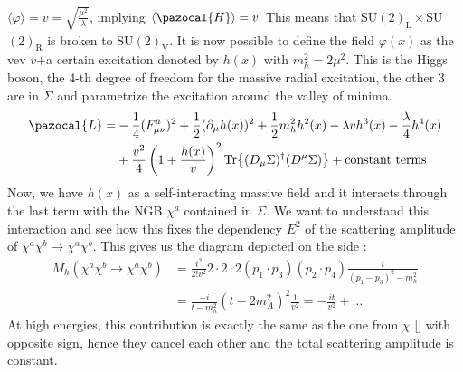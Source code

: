 \documentclass[../main.tex]{subfiles}
\begin{document}
$\langle\varphi\rangle=v=\sqrt{\frac{\mu^2}{\lambda}}$, implying $\langle\pazocal{H}\rangle=v$ This means that SU$(2)_{\text{L}}\times$SU$(2)_{\text{R}}$ is broken to SU$(2)_{\text{V}}$. It is now possible to define the field $\varphi(x)$ as the vev $v$+a certain excitation denoted by $h(x)$ with $m_h^2=2\mu^2$. This is the Higgs boson, the 4-th degree of freedom for the massive radial excitation, the other 3 are in $\Sigma$ and parametrize the excitation around the valley of minima.
\begin{align*}
\pazocal{L}=&-\frac{1}{4}(F_{\mu\nu}^a)^2+\frac{1}{2}(\partial_\mu h(x))^2+\frac{1}{2}m_h^2h^2(x)-\lambda vh^3(x)-\frac{\lambda}{4}h^4(x)\\
&+\frac{v^2}{4}\left(1+\frac{h(x)}{v}\right)^2\Tr{(D_\mu\Sigma)^\dagger(D^\mu\Sigma)}+\text{constant terms}
\end{align*}
Now, we have $h(x)$ as a self-interacting massive field and it interacts through the last term with the NGB $\chi^a$ contained in $\Sigma$. We want to understand this interaction and see how this fixes the dependency $E^2$ of the scattering amplitude of $\chi^a\chi^b\to\chi^a\chi^b$. This gives us the diagram depicted on the side :
\begin{align*}
M_h(\chi^a\chi^b\to\chi^a\chi^b)&=\frac{i^2}{2!v^2}2\cdot2\cdot2(p_1\cdot p_3)(p_2\cdot p_4)\frac{i}{(p_1-p_3)^2-m_h^2}\\
&=\frac{-i}{t-m_h^2}(t-2m_A^2)^2\frac{1}{v^2}=-\frac{it}{v^2}+\dots
\end{align*}
At high energies, this contribution is exactly the same as the one from $\chi$ [] with opposite sign, hence they cancel each other and the total scattering amplitude is constant. 
\end{document}
